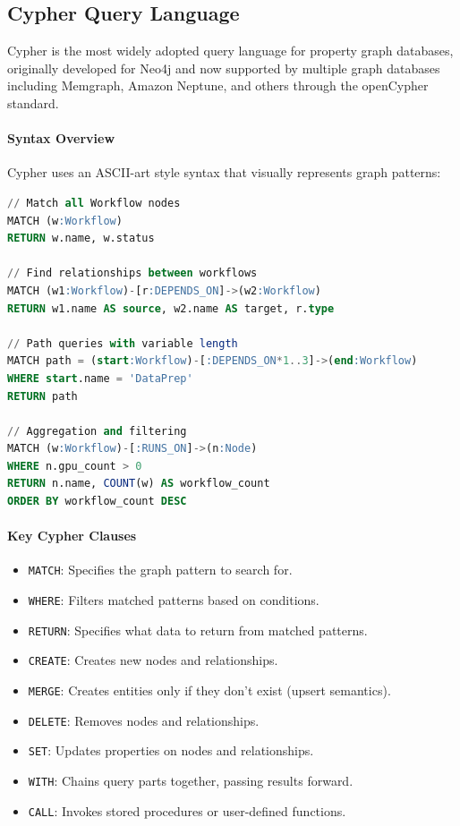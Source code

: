 \documentclass[a4paper,twoside]{sapthesis}
\begin{document}
\subsection{Cypher Query Language}

Cypher is the most widely adopted query language for property graph databases, originally developed for Neo4j and now supported by multiple graph databases including Memgraph, Amazon Neptune, and others through the openCypher standard.

\paragraph{Syntax Overview}

Cypher uses an ASCII-art style syntax that visually represents graph patterns:

\begin{lstlisting}[language=SQL,caption={Basic Cypher query examples}]
// Match all Workflow nodes
MATCH (w:Workflow)
RETURN w.name, w.status

// Find relationships between workflows
MATCH (w1:Workflow)-[r:DEPENDS_ON]->(w2:Workflow)
RETURN w1.name AS source, w2.name AS target, r.type

// Path queries with variable length
MATCH path = (start:Workflow)-[:DEPENDS_ON*1..3]->(end:Workflow)
WHERE start.name = 'DataPrep'
RETURN path

// Aggregation and filtering
MATCH (w:Workflow)-[:RUNS_ON]->(n:Node)
WHERE n.gpu_count > 0
RETURN n.name, COUNT(w) AS workflow_count
ORDER BY workflow_count DESC
\end{lstlisting}

\paragraph{Key Cypher Clauses}

\begin{itemize}
    \item \texttt{MATCH}: Specifies the graph pattern to search for.
    \item \texttt{WHERE}: Filters matched patterns based on conditions.
    \item \texttt{RETURN}: Specifies what data to return from matched patterns.
    \item \texttt{CREATE}: Creates new nodes and relationships.
    \item \texttt{MERGE}: Creates entities only if they don't exist (upsert semantics).
    \item \texttt{DELETE}: Removes nodes and relationships.
    \item \texttt{SET}: Updates properties on nodes and relationships.
    \item \texttt{WITH}: Chains query parts together, passing results forward.
    \item \texttt{CALL}: Invokes stored procedures or user-defined functions.
\end{itemize}
\end{document}
